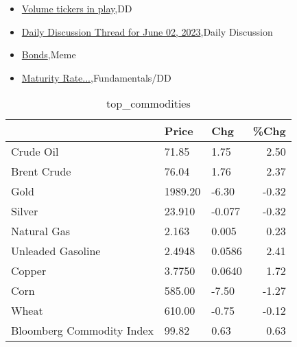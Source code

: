 \documentclass{article}%
\begin{document}
%
\begin{itemize}%
\item%
\href{https://reddit.com/r/wallstreetbets/comments/13yaqxi/volume\_tickers\_in\_play/}{Volume tickers in play},DD%
\item%
\href{https://reddit.com/r/wallstreetbets/comments/13y8fn8/daily\_discussion\_thread\_for\_june\_02\_2023/}{Daily Discussion Thread for June 02, 2023},Daily Discussion%
\item%
\href{https://reddit.com/r/wallstreetbets/comments/13y7vzo/bonds/}{Bonds},Meme%
\item%
\href{https://reddit.com/r/StockMarket/comments/13y7jum/maturity\_rate/}{Maturity Rate...},Fundamentals/DD%
\end{itemize}%


\begin{table}[htbp]%
\caption{top\_commodities}%
\centering%
\begin{adjustbox}{width=1\textwidth}%
\begin{tabular}{lllr}
\toprule
                          &   Price &    Chg &  \%Chg \\
\midrule
               Crude Oil  &   71.85 &   1.75 &  2.50 \\
             Brent Crude  &   76.04 &   1.76 &  2.37 \\
                    Gold  & 1989.20 &  -6.30 & -0.32 \\
                  Silver  &  23.910 & -0.077 & -0.32 \\
             Natural Gas  &   2.163 &  0.005 &  0.23 \\
       Unleaded Gasoline  &  2.4948 & 0.0586 &  2.41 \\
                  Copper  &  3.7750 & 0.0640 &  1.72 \\
                    Corn  &  585.00 &  -7.50 & -1.27 \\
                   Wheat  &  610.00 &  -0.75 & -0.12 \\
Bloomberg Commodity Index &   99.82 &   0.63 &  0.63 \\
\bottomrule
\end{tabular}
%
\end{adjustbox}%
\end{table}

%
\end{document}
